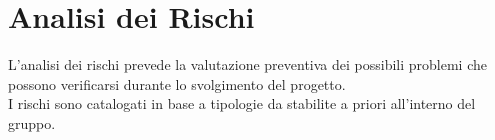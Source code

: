 \section{Analisi dei Rischi}

L'analisi dei rischi prevede la valutazione preventiva dei possibili problemi che possono verificarsi durante lo svolgimento del progetto. \\
I rischi sono catalogati in base a tipologie da stabilite a priori all'interno del gruppo. 